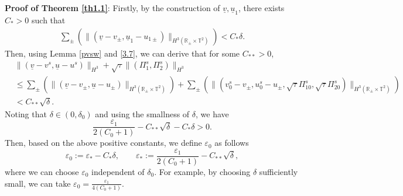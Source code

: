 \documentclass[10pt,reqno]{amsart}
\numberwithin{equation}{section}
\begin{document}
{\bf{Proof of Theorem \ref{th1.1}}}:  Firstly, by the construction of $\underline v, \underline {u}_1$, there exists $C_\ast>0$ such that
\begin{align}\label{3.7}
\sum\limits_{\pm}\left(\|(\underline{v}-v_{\pm},\underline{u}_1-u_{1\pm})\|
_{H^3(\mathbb{R}_{\pm}\times\mathbb{T}^2)}\right)
<C_\ast \delta.
\end{align}
Then, using Lemma \ref{pvsw} and \eqref{3.7}, we can derive that for some $C_{\ast\ast}>0$,
\begin{equation}\label{3.8}
\begin{aligned}
&\|(\underline{v}-v^s,\underline{u}-u^s)\|_{H^3}
+\sqrt{\tau}\|(\Pi_1^s, \Pi_2^s)\|_{H^3}\\
&\le
\sum\limits_{\pm}\left(\|(\underline{v}-v_{\pm},\underline{u}-u_{\pm})\|
_{H^3(\mathbb{R}_{\pm}\times\mathbb{T}^2)}\right)
+\sum\limits_{\pm}\left(\|( v^s_0-v_{\pm}, u^s_0-u_{\pm}, \sqrt{\tau}\Pi^s_{10}, \sqrt{\tau}\Pi^s_{20})\|_{H^3(\mathbb{R}_{\pm}\times\mathbb{T}^2)}\right)
\\
&<C_{\ast\ast}\sqrt{\delta}.
\end{aligned}
\end{equation}
Noting that $\delta\in(0, \delta_0)$ and using the smallness of $\delta$, we have
\begin{equation}\label{3.9}
\frac{\varepsilon_1}{2(C_0+1)}-C_{\ast\ast}\sqrt{\delta}
-C_{\ast}\delta>0.
\end{equation}
Then, based on the above positive constants, we define $\varepsilon_0$ as follows
\[
\varepsilon_0:=\varepsilon_\ast-C_\ast\delta,\qquad
\varepsilon_\ast:=\frac{\varepsilon_1}{2(C_0+1)}-C_{\ast\ast}\sqrt{\delta},
\]
where we can choose $\varepsilon_0$ independent of $\delta_0$. For example, by choosing $\delta$ sufficiently small, we can take $\varepsilon_0=\frac{\varepsilon_1}{4 (C_0+1)}$.
\end{document}

